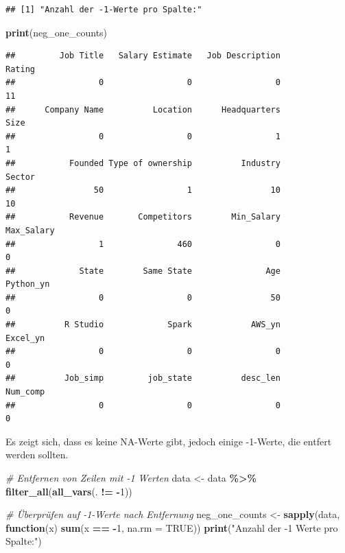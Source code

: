 \documentclass[
]{article}
\newenvironment{Shaded}{\begin{snugshade}}{\end{snugshade}}
\newcommand{\AttributeTok}[1]{\textcolor[rgb]{0.13,0.29,0.53}{#1}}
\newcommand{\CommentTok}[1]{\textcolor[rgb]{0.56,0.35,0.01}{\textit{#1}}}
\newcommand{\ConstantTok}[1]{\textcolor[rgb]{0.56,0.35,0.01}{#1}}
\newcommand{\ControlFlowTok}[1]{\textcolor[rgb]{0.13,0.29,0.53}{\textbf{#1}}}
\newcommand{\DecValTok}[1]{\textcolor[rgb]{0.00,0.00,0.81}{#1}}
\newcommand{\FunctionTok}[1]{\textcolor[rgb]{0.13,0.29,0.53}{\textbf{#1}}}
\newcommand{\NormalTok}[1]{#1}
\newcommand{\OtherTok}[1]{\textcolor[rgb]{0.56,0.35,0.01}{#1}}
\newcommand{\SpecialCharTok}[1]{\textcolor[rgb]{0.81,0.36,0.00}{\textbf{#1}}}
\newcommand{\StringTok}[1]{\textcolor[rgb]{0.31,0.60,0.02}{#1}}
\begin{document}
\begin{verbatim}
## [1] "Anzahl der -1-Werte pro Spalte:"
\end{verbatim}

\begin{Shaded}
\begin{Highlighting}[]
\FunctionTok{print}\NormalTok{(neg\_one\_counts)}
\end{Highlighting}
\end{Shaded}

\begin{verbatim}
##         Job Title   Salary Estimate   Job Description            Rating 
##                 0                 0                 0                11 
##      Company Name          Location      Headquarters              Size 
##                 0                 0                 1                 1 
##           Founded Type of ownership          Industry            Sector 
##                50                 1                10                10 
##           Revenue       Competitors        Min_Salary        Max_Salary 
##                 1               460                 0                 0 
##             State        Same State               Age         Python_yn 
##                 0                 0                50                 0 
##          R Studio             Spark            AWS_yn          Excel_yn 
##                 0                 0                 0                 0 
##          Job_simp         job_state          desc_len          Num_comp 
##                 0                 0                 0                 0
\end{verbatim}

Es zeigt sich, dass es keine NA-Werte gibt, jedoch einige -1-Werte, die
entfert werden sollten.

\begin{Shaded}
\begin{Highlighting}[]
\CommentTok{\# Entfernen von Zeilen mit {-}1 Werten}
\NormalTok{data }\OtherTok{\textless{}{-}}\NormalTok{ data }\SpecialCharTok{\%\textgreater{}\%}
  \FunctionTok{filter\_all}\NormalTok{(}\FunctionTok{all\_vars}\NormalTok{(. }\SpecialCharTok{!=} \SpecialCharTok{{-}}\DecValTok{1}\NormalTok{))}

\CommentTok{\# Überprüfen auf {-}1{-}Werte nach Entfernung}
\NormalTok{neg\_one\_counts }\OtherTok{\textless{}{-}} \FunctionTok{sapply}\NormalTok{(data, }\ControlFlowTok{function}\NormalTok{(x) }\FunctionTok{sum}\NormalTok{(x }\SpecialCharTok{==} \SpecialCharTok{{-}}\DecValTok{1}\NormalTok{, }\AttributeTok{na.rm =} \ConstantTok{TRUE}\NormalTok{))}
\FunctionTok{print}\NormalTok{(}\StringTok{"Anzahl der {-}1 Werte pro Spalte:"}\NormalTok{)}
\end{Highlighting}
\end{Shaded}
\end{document}
